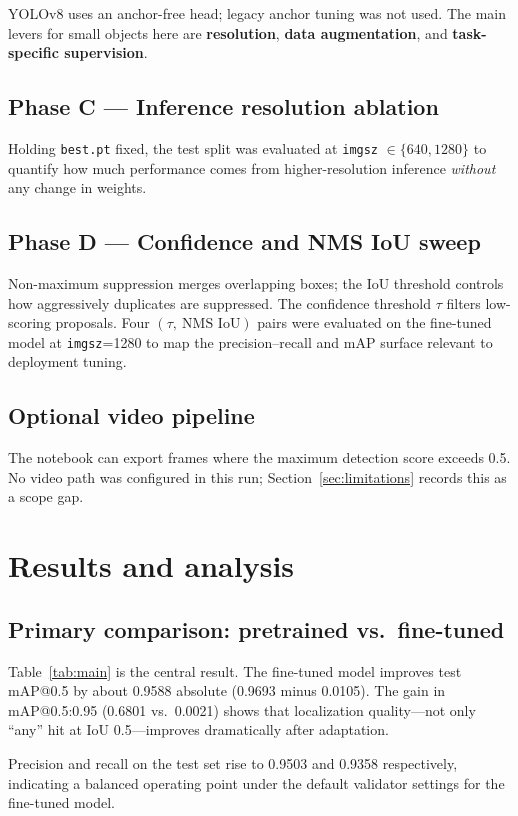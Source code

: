 \documentclass[11pt,a4paper]{article}
\begin{document}
YOLOv8 uses an anchor-free head; legacy anchor tuning was not used. The main levers for small objects here are \textbf{resolution}, \textbf{data augmentation}, and \textbf{task-specific supervision}.

\subsection{Phase C --- Inference resolution ablation}
Holding \texttt{best.pt} fixed, the test split was evaluated at \texttt{imgsz} $\in \{\num{640},\num{1280}\}$ to quantify how much performance comes from higher-resolution inference \emph{without} any change in weights.

\subsection{Phase D --- Confidence and NMS IoU sweep}
Non-maximum suppression merges overlapping boxes; the IoU threshold controls how aggressively duplicates are suppressed. The confidence threshold $\tau$ filters low-scoring proposals. Four $(\tau,\ \text{NMS IoU})$ pairs were evaluated on the fine-tuned model at \texttt{imgsz}=\num{1280} to map the precision--recall and mAP surface relevant to deployment tuning.

\subsection{Optional video pipeline}
The notebook can export frames where the maximum detection score exceeds \num{0.5}. No video path was configured in this run; Section~\ref{sec:limitations} records this as a scope gap.

\section{Results and analysis}
\label{sec:results}

\subsection{Primary comparison: pretrained vs.\ fine-tuned}
Table~\ref{tab:main} is the central result. The fine-tuned model improves test mAP@0.5 by about \num{0.9588} absolute (\num{0.9693} minus \num{0.0105}). The gain in mAP@0.5:0.95 (\num{0.6801} vs.\ \num{0.0021}) shows that localization quality---not only ``any'' hit at IoU \num{0.5}---improves dramatically after adaptation.

Precision and recall on the test set rise to \num{0.9503} and \num{0.9358} respectively, indicating a balanced operating point under the default validator settings for the fine-tuned model.
\end{document}
